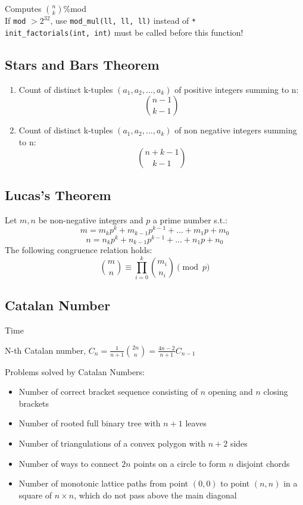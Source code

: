 Computes $\binom{n}{k}$\:\%\:mod \\
If \verb|mod| $> 2^{32}$, use \verb|mod_mul(ll, ll, ll)| instead of \verb|*| \\
\verb|init_factorials(int, int)| must be called before this function!

\subsection{Stars and Bars Theorem}
\begin{enumerate}
	\item Count of distinct k-tuples $(a_1, a_2, ..., a_k)$ of positive integers summing to n: \[\binom{n-1}{k-1}\]
	\item Count of distinct k-tuples $(a_1, a_2, ..., a_k)$ of non negative integers summing to n: \[\binom{n+k-1}{k-1}\]
\end{enumerate}

\subsection{Lucas's Theorem}
Let $m, n$ be non-negative integers and $p$ a prime number s.t.: \\
\[m = m_k p^k + m_{k-1} p^{k-1} + \ldots + m_1 p + m_0\]
\[n = n_k p^k + n_{k-1} p^{k-1} + \ldots + n_1 p + n_0\]
The following congruence relation holds:
\[\binom{m}{n} \equiv \prod_{i=0}^k\binom{m_i}{n_i} \pmod{p}\]


\subsection{Catalan Number}
 Time

N-th Catalan number, $C_n = \frac{1}{n+1}\binom{2n}{n} = \frac{4n-2}{n+1}C_{n-1}$

Problems solved by Catalan Numbers:
\begin{itemize}
	\item Number of correct bracket sequence consisting of $n$ opening and $n$ closing brackets
	\item Number of rooted full binary tree with $n + 1$ leaves
	\item Number of triangulations of a convex polygon with $n + 2$ sides
	\item Number of ways to connect $2n$ points on a circle to form $n$ disjoint chords
	\item Number of monotonic lattice paths from point $(0, 0)$ to point $(n, n)$ in a square of $n \times n$, which do not pass above the main diagonal
\end{itemize}

